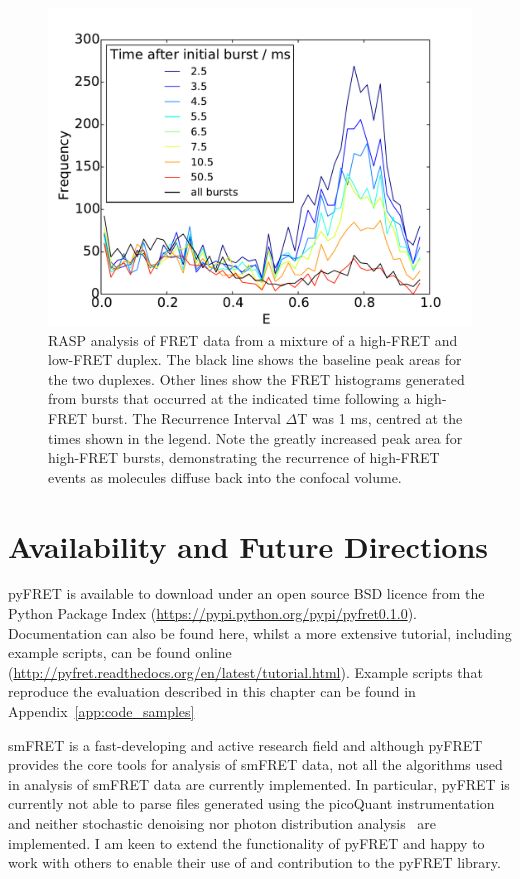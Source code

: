 \begin{figure}[!ht]
   \begin{center}
      \includegraphics*[clip=true, width=6in]{pyFRET/RASP_performance.pdf}
      \caption{RASP analysis of FRET data from a mixture of a high-FRET and low-FRET duplex. The black line shows the baseline peak areas for the two duplexes. Other lines show the FRET histograms generated from bursts that occurred at the indicated time following a high-FRET burst. The Recurrence Interval $\Delta$T was 1 ms, centred at the times shown in the legend. Note the greatly increased peak area for high-FRET bursts, demonstrating the recurrence of high-FRET events as molecules diffuse back into the confocal volume.}
      \label{fig:fig9_RASP}
   \end{center}
\end{figure}


\section{Availability and Future Directions}
\label{sect:availability}
pyFRET is available to download under an open source BSD licence from the Python Package Index (\url{https://pypi.python.org/pypi/pyfret0.1.0}). Documentation can also be found here, whilst a more extensive tutorial, including example scripts, can be found online (\url{http://pyfret.readthedocs.org/en/latest/tutorial.html}). Example scripts that reproduce the evaluation described in this chapter can be found in Appendix~\ref{app:code_samples}

smFRET is a fast-developing and active research field and although pyFRET provides the core tools for analysis of smFRET data, not all the algorithms used in analysis of smFRET data are currently implemented. In particular, pyFRET is currently not able to parse files generated using the picoQuant instrumentation and neither stochastic denoising nor photon distribution analysis~\cite{kalinin2007, antonik2006, santoso10, torella11} are implemented. I am keen to extend the functionality of pyFRET and happy to work with others to enable their use of and contribution to the pyFRET library.

